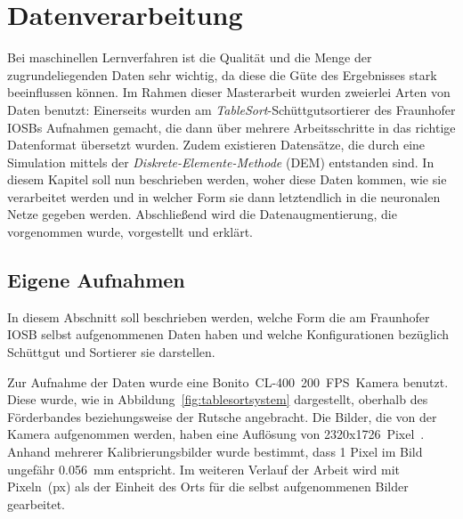 \chapter{Datenverarbeitung}
\label{cap:data}

Bei maschinellen Lernverfahren ist die Qualität und die Menge der zugrundeliegenden Daten sehr wichtig,
da diese die Güte des Ergebnisses stark beeinflussen können.
Im Rahmen dieser Masterarbeit wurden zweierlei Arten von Daten benutzt:
Einerseits wurden am \textit{TableSort}-Schüttgutsortierer des Fraunhofer IOSBs Aufnahmen gemacht, 
die dann über mehrere Arbeitsschritte in das richtige Datenformat übersetzt wurden.
Zudem existieren Datensätze, die durch eine Simulation mittels der \textit{Diskrete-Elemente-Methode} (DEM) entstanden sind. 
In diesem Kapitel soll nun beschrieben werden, woher diese Daten kommen, wie sie verarbeitet werden 
und in welcher Form sie dann letztendlich in die neuronalen Netze gegeben werden.
Abschließend wird die Datenaugmentierung, die vorgenommen wurde, vorgestellt und erklärt.





\section{Eigene Aufnahmen}

In diesem Abschnitt soll beschrieben werden, welche Form die am Fraunhofer IOSB selbst aufgenommenen Daten haben und welche Konfigurationen bezüglich Schüttgut und Sortierer sie darstellen.





Zur Aufnahme der Daten wurde eine Bonito~CL-400~200~FPS~Kamera benutzt. 
Diese wurde, wie in Abbildung~\ref{fig:tablesortsystem} dargestellt, oberhalb des Förderbandes beziehungsweise der Rutsche angebracht.
Die Bilder, die von der Kamera aufgenommen werden, haben eine Auflösung von 2320x1726~Pixel~\cite{alliedvisiontechnologiesgmbh2014}.
Anhand mehrerer Kalibrierungsbilder wurde bestimmt, dass 1 Pixel im Bild ungefähr \SI{0.056}{\milli\meter} entspricht.
Im weiteren Verlauf der Arbeit wird mit Pixeln~(px) als der Einheit des Orts für die selbst aufgenommenen Bilder gearbeitet.

